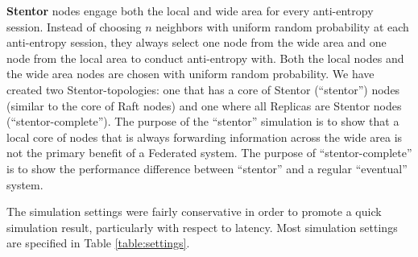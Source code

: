 \documentclass[11pt,letterpaper]{article}
\begin{document}
\textbf{Stentor} nodes engage both the local and wide area for every anti-entropy session. Instead of choosing $n$ neighbors with uniform random probability at each anti-entropy session, they always select one node from the wide area and one node from the local area to conduct anti-entropy with. Both the local nodes and the wide area nodes are chosen with uniform random probability. We have created two Stentor-topologies: one that has a core of Stentor (``stentor'') nodes (similar to the core of Raft nodes) and one where all Replicas are Stentor nodes (``stentor-complete''). The purpose of the ``stentor'' simulation is to show that a local core of nodes that is always forwarding information across the wide area is not the primary benefit of a Federated system. The purpose of ``stentor-complete'' is to show the performance difference between ``stentor'' and a regular ``eventual'' system.

The simulation settings were fairly conservative in order to promote a quick simulation result, particularly with respect to latency. Most simulation settings are specified in Table \ref{table:settings}.
\end{document}
